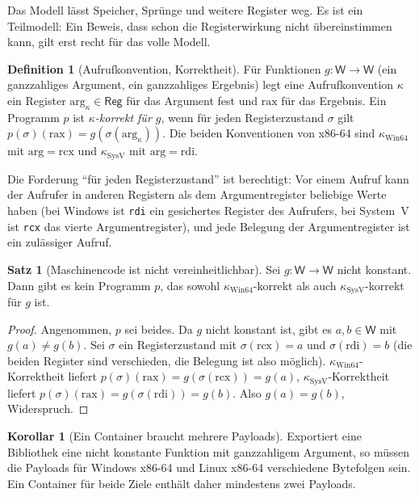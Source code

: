 \documentclass[a4paper,12pt,twoside]{report}
\DeclareRobustCommand{\_}{\ifmmode\mbox{\textunderscore}\else\textunderscore\allowbreak{}\fi}
\theoremstyle{definition}
\newtheorem{definition}{Definition}[chapter]
\newtheorem{satz}{Satz}[chapter]
\newtheorem{korollar}{Korollar}[chapter]
\begin{document}
Das Modell lässt Speicher, Sprünge und weitere Register weg. Es ist ein Teilmodell: Ein Beweis, dass schon die Registerwirkung nicht übereinstimmen kann, gilt erst recht für das volle Modell.

\begin{definition}[Aufrufkonvention, Korrektheit]
	Für Funktionen $g:\mathsf W\to\mathsf W$ (ein ganzzahliges Argument, ein ganzzahliges Ergebnis) legt eine Aufrufkonvention $\kappa$ ein Register $\mathrm{arg}_\kappa\in\mathsf{Reg}$ für das Argument fest und $\mathrm{rax}$ für das Ergebnis. Ein Programm $p$ ist \emph{$\kappa$-korrekt für $g$}, wenn für jeden Registerzustand $\sigma$ gilt $p(\sigma)(\mathrm{rax})=g(\sigma(\mathrm{arg}_\kappa))$. Die beiden Konventionen von x86-64 sind $\kappa_{\mathrm{Win64}}$ mit $\mathrm{arg}=\mathrm{rcx}$ und $\kappa_{\mathrm{SysV}}$ mit $\mathrm{arg}=\mathrm{rdi}$.
\end{definition}

Die Forderung ``für jeden Registerzustand'' ist berechtigt: Vor einem Aufruf kann der Aufrufer in anderen Registern als dem Argumentregister beliebige Werte haben (bei Windows ist \texttt{rdi} ein gesichertes Register des Aufrufers, bei System~V ist \texttt{rcx} das vierte Argumentregister), und jede Belegung der Argumentregister ist ein zulässiger Aufruf.

\begin{satz}[Maschinencode ist nicht vereinheitlichbar]
	\label{satz:abi}
	Sei $g:\mathsf W\to\mathsf W$ nicht konstant. Dann gibt es kein Programm $p$, das sowohl $\kappa_{\mathrm{Win64}}$-korrekt als auch $\kappa_{\mathrm{SysV}}$-korrekt für $g$ ist.
\end{satz}

\begin{proof}
	Angenommen, $p$ sei beides. Da $g$ nicht konstant ist, gibt es $a,b\in\mathsf W$ mit $g(a)\neq g(b)$. Sei $\sigma$ ein Registerzustand mit $\sigma(\mathrm{rcx})=a$ und $\sigma(\mathrm{rdi})=b$ (die beiden Register sind verschieden, die Belegung ist also möglich). $\kappa_{\mathrm{Win64}}$-Korrektheit liefert $p(\sigma)(\mathrm{rax})=g(\sigma(\mathrm{rcx}))=g(a)$, $\kappa_{\mathrm{SysV}}$-Korrektheit liefert $p(\sigma)(\mathrm{rax})=g(\sigma(\mathrm{rdi}))=g(b)$. Also $g(a)=g(b)$, Widerspruch.
\end{proof}

\begin{korollar}[Ein Container braucht mehrere Payloads]
	\label{kor:payloads}
	Exportiert eine Bibliothek eine nicht konstante Funktion mit ganzzahligem Argument, so müssen die Payloads für Windows x86-64 und Linux x86-64 verschiedene Bytefolgen sein. Ein Container für beide Ziele enthält daher mindestens zwei Payloads.
\end{korollar}
\end{document}
